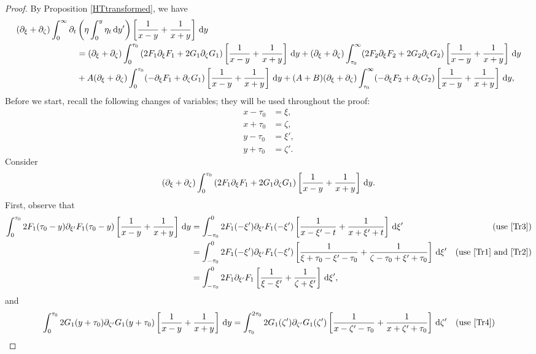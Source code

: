 \documentclass[10pt,reqno,oneside,a4paper, landscape]{article}
\begin{document}
\begin{proof}
By Proposition \ref{HTtransformed}, we have
\begin{align*}
(\partial_\xi + \partial_\zeta)\int_0^\infty \partial_t &\left( \eta \int^{y}_0\eta_{t} \,\mathrm{d} y' \right) \left[ \frac{1}{x-y} + \frac{1}{x+y} \right] \,\mathrm{d} y \\
&=  (\partial_\xi + \partial_\zeta) \int_0^{\tau_0} \left( 2 F_1  \partial_\xi F_1 + 2 G_1 \partial_\zeta G_1 \right) \left[ \frac{1}{x-y} + \frac{1}{x+y} \right] \,\mathrm{d} y + (\partial_\xi + \partial_\zeta)\int_{\tau_0}^\infty (2 F_2 \partial_\xi F_2 + 2 G_2 \partial_\zeta G_2 )\left[ \frac{1}{x-y} + \frac{1}{x+y} \right] \,\mathrm{d} y \\
&+ A (\partial_\xi + \partial_\zeta)\int_0^{\tau_0} (-\partial_\xi F_1 + \partial_\zeta G_1) \left[ \frac{1}{x-y} + \frac{1}{x+y} \right] \,\mathrm{d} y + (A+B)(\partial_\xi + \partial_\zeta)\int_{\tau_0}^\infty (- \partial_\xi F_2+ \partial_\zeta G_2) \left[ \frac{1}{x-y} + \frac{1}{x+y} \right] \,\mathrm{d} y,
\end{align*}
Before we start, recall the following changes of variables; they will be used throughout the proof:
\begin{align}
x - \tau_0 &= \xi, \label{Tr1} \\
x + \tau_0 &= \zeta, \label{Tr2} \\
y - \tau_0 &= \xi', \label{Tr3} \\
y + \tau_0 &= \zeta'. \label{Tr4}
\end{align} 
Consider 
\[ (\partial_\xi + \partial_\zeta) \int_0^{\tau_0} \left( 2 F_1  \partial_\xi F_1 + 2 G_1 \partial_\zeta G_1 \right) \left[ \frac{1}{x-y} + \frac{1}{x+y} \right] \,\mathrm{d} y. \]
First, observe that 
\begin{align*}
\int_0^{\tau_0} 2 F_1(\tau_0-y) \partial_{\xi'} F_1(\tau_0-y) \left[ \frac{1}{x-y} + \frac{1}{x+y} \right] \,\mathrm{d} y  &= \int^{0}_{-\tau_0} 2 F_1(-\xi')  \partial_{\xi'}F_1(-\xi') \left[ \frac{1}{x-\xi'-t} +  \frac{1}{x+\xi' + t} \right] \,\mathrm{d} \xi' &\text{(use \eqref{Tr3})} \\
&= \int^{0}_{-\tau_0} 2 F_1(-\xi')  \partial_{\xi'}F_1(-\xi') \left[ \frac{1}{\xi + \tau_0 -\xi'- \tau_0} +\frac{1}{\zeta - \tau_0 +\xi' + \tau_0} \right] \,\mathrm{d} \xi'  &\text{(use \eqref{Tr1} and \eqref{Tr2})} \\
&= \int^{0}_{-\tau_0} 2 F_1 \partial_{\xi'}F_1 \left[ \frac{1}{\xi -\xi'} + \frac{1}{\zeta +\xi'} \right] \,\mathrm{d} \xi',
\end{align*}
and 
\begin{align*}
\int_0^{\tau_0} 2 G_1(y+\tau_0) \partial_{\zeta'} G_1(y+\tau_0) \left[ \frac{1}{x-y} + \frac{1}{x+y} \right] \D y &= \int_{\tau_0}^{2\tau_0} 2 G_1(\zeta') \partial_{\zeta'} G_1(\zeta') \left[ \frac{1}{x-\zeta' - \tau_0} + \frac{1}{x+\zeta' + \tau_0} \right] \D \zeta' &\text{(use \eqref{Tr4})} \\

\end{align*}
\end{proof}
\end{document}

